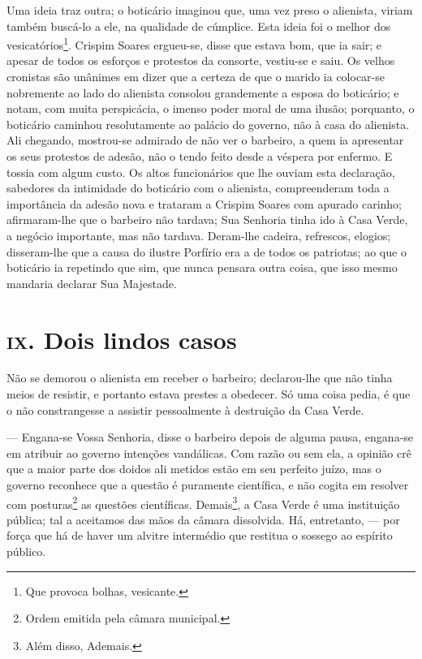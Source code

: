Uma ideia traz outra; o boticário imaginou que, uma vez preso o
alienista, viriam também buscá-lo a ele, na qualidade de cúmplice. Esta
ideia foi o melhor dos vesicatórios\footnote{Que provoca bolhas,
  vesicante.}. Crispim Soares ergueu-se, disse que estava bom, que ia
sair; e apesar de todos os esforços e protestos da consorte, vestiu-se e
saiu. Os velhos cronistas são unânimes em dizer que a certeza de que o
marido ia colocar-se nobremente ao lado do alienista consolou
grandemente a esposa do boticário; e notam, com muita perspicácia, o
imenso poder moral de uma ilusão; porquanto, o boticário caminhou
resolutamente ao palácio do governo, não à casa do alienista. Ali
chegando, mostrou-se admirado de não ver o barbeiro, a quem ia
apresentar os seus protestos de adesão, não o tendo feito desde a
véspera por enfermo. E tossia com algum custo. Os altos funcionários que
lhe ouviam esta declaração, sabedores da intimidade do boticário com o
alienista, compreenderam toda a importância da adesão nova e trataram a
Crispim Soares com apurado carinho; afirmaram-lhe que o barbeiro não
tardava; Sua Senhoria tinha ido à Casa Verde, a negócio importante, mas
não tardava. Deram-lhe cadeira, refrescos, elogios; disseram-lhe que a
causa do ilustre Porfírio era a de todos os patriotas; ao que o
boticário ia repetindo que sim, que nunca pensara outra coisa, que isso
mesmo mandaria declarar Sua Majestade.

\chapter{\textsc{ix}. Dois lindos casos }

Não se demorou o alienista em receber o barbeiro; declarou-lhe que não
tinha meios de resistir, e portanto estava prestes a obedecer. Só uma
coisa pedia, é que o não constrangesse a assistir pessoalmente à
destruição da Casa Verde.

--- Engana-se Vossa Senhoria, disse o barbeiro depois de alguma pausa,
engana-se em atribuir ao governo intenções vandálicas. Com razão ou sem
ela, a opinião crê que a maior parte dos doidos ali metidos estão em seu
perfeito juízo, mas o governo reconhece que a questão é puramente
científica, e não cogita em resolver com posturas\footnote{Ordem emitida
  pela câmara municipal.} as questões científicas. Demais\footnote{Além
  disso, Ademais.}, a Casa Verde é uma instituição pública; tal a
aceitamos das mãos da câmara dissolvida. Há, entretanto, --- por força
que há de haver um alvitre intermédio que restitua o sossego ao espírito
público.

